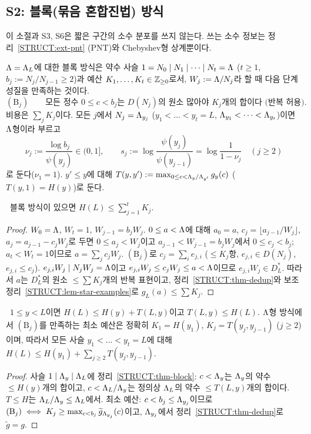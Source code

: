 \subsection{S2: 블록(묶음 혼합진법) 방식}
\label{STRUCT:sec-S2}

이 소절과 S3, S6은 짧은 구간의 소수 분포를 쓰지 않는다. 쓰는 소수 정보는 정리~\ref{STRUCT:ext-pnt} (PNT)와 Chebyshev형 상계뿐이다.

\begin{definition}[블록 방식]\label{STRUCT:def-block}
$\Lambda=\Lambda_L$에 대한 블록 방식은 약수 사슬 $1=N_0\mid N_1\mid\dots\mid N_t=\Lambda$ ($t\ge1$, $b_j:=N_j/N_{j-1}\ge2$)과 예산 $K_1,\dots,K_t\in\mathbb{Z}_{\ge0}$로서, $W_j:=\Lambda/N_j$라 할 때 다음 단계성질을 만족하는 것이다.
\[
(\mathrm B_j)\qquad \text{모든 정수 } 0\le c<b_j \text{는 } D(N_j) \text{의 원소 많아야 } K_j \text{개의 합이다 (반복 허용).}
\]
비용은 $\sum_jK_j$이다. 모든 $j$에서 $N_j=\Lambda_{y_j}$ ($y_1<\dots<y_t=L$, $\Lambda_{y_1}<\dots<\Lambda_{y_t}$)이면 $\Lambda$형이라 부르고
\[
\nu_j:=\frac{\log b_j}{\psi(y_j)}\in(0,1],\qquad s_j:=\log\frac{\psi(y_j)}{\psi(y_{j-1})}=\log\frac1{1-\nu_j}\quad(j\ge2)
\]
로 둔다($\nu_1=1$). $y'\le y$에 대해 $T(y,y'):=\max_{0\le c<\Lambda_y/\Lambda_{y'}}g_y(c)$ ($T(y,1)=H(y)$)로 둔다.
\end{definition}

\begin{theorem}[블록 방식 상계]\label{STRUCT:thm-block}
\PROVED\ 블록 방식이 있으면 $H(L)\le\sum_{j=1}^tK_j$.
\end{theorem}
\begin{proof}
$W_0=\Lambda$, $W_t=1$, $W_{j-1}=b_jW_j$. $0\le a<\Lambda$에 대해 $a_0=a$, $c_j=\lfloor a_{j-1}/W_j\rfloor$, $a_j=a_{j-1}-c_jW_j$로 두면 $0\le a_j<W_j$이고 $a_{j-1}<W_{j-1}=b_jW_j$에서 $0\le c_j<b_j$; $a_t<W_t=1$이므로 $a=\sum_jc_jW_j$.
$(\mathrm B_j)$로 $c_j=\sum_ie_{j,i}$ ($\le K_j$항, $e_{j,i}\in D(N_j)$, $e_{j,i}\le c_j$). $e_{j,i}W_j\mid N_jW_j=\Lambda$이고 $e_{j,i}W_j\le c_jW_j\le a<\Lambda$이므로 $e_{j,i}W_j\in D^*_L$. 따라서 $a$는 $D^*_L$의 원소 $\le\sum K_j$개의 반복 표현이고, 정리~\ref{STRUCT:thm-dedup}와 보조정리~\ref{STRUCT:lem-star-examples}로 $g_L(a)\le\sum K_j$.
\end{proof}

\begin{corollary}\label{STRUCT:cor-selfsim}
\PROVED\ $1\le y<L$이면 $H(L)\le H(y)+T(L,y)$이고 $T(L,y)\le H(L)$. $\Lambda$형 방식에서 $(\mathrm B_j)$를 만족하는 최소 예산은 정확히 $K_1=H(y_1)$, $K_j=T(y_j,y_{j-1})$ ($j\ge2$)이며, 따라서 모든 사슬 $y_1<\dots<y_t=L$에 대해 $H(L)\le H(y_1)+\sum_{j\ge2}T(y_j,y_{j-1})$.
\end{corollary}
\begin{proof}
사슬 $1\mid\Lambda_y\mid\Lambda_L$에 정리~\ref{STRUCT:thm-block}: $c<\Lambda_y$는 $\Lambda_y$의 약수 $\le H(y)$개의 합이고, $c<\Lambda_L/\Lambda_y$는 정의상 $\Lambda_L$의 약수 $\le T(L,y)$개의 합이다. $T\le H$는 $\Lambda_L/\Lambda_y\le\Lambda_L$에서. 최소 예산: $c<b_j\le\Lambda_{y_j}$이므로 $(\mathrm B_j)\iff K_j\ge\max_{c<b_j}\widetilde g_{\Lambda_{y_j}}(c)$이고, $\Lambda_{y_j}$에서 정리~\ref{STRUCT:thm-dedup}로 $\widetilde g=g$.
\end{proof}

